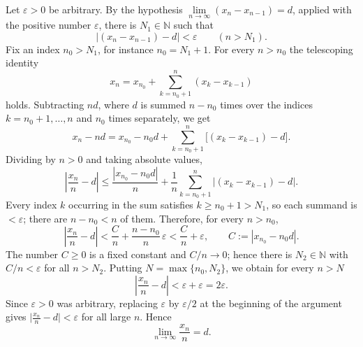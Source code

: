 \documentclass[11pt,a4paper]{article}
\newenvironment{solution}[1]{%
  \par\addvspace{1.7ex}%
  \noindent{\color{solutioncolor}\textbf{#1}}\hspace{0.55em}\ignorespaces}%
  {\par\addvspace{0.9ex}}
\begin{document}
\begin{solution}{Solution 2.1.9}\label{xs:2.1.9}
Let $\varepsilon>0$ be arbitrary. By the hypothesis $\lim\limits_{n\to\infty}(x_n-x_{n-1})=d$, applied with the positive number $\varepsilon$, there is $N_1\in\mathbb{N}$ such that
\[
\bigl|(x_n-x_{n-1})-d\bigr|<\varepsilon\qquad(n>N_1).
\]
Fix an index $n_0>N_1$, for instance $n_0=N_1+1$. For every $n>n_0$ the telescoping identity
\[
x_n=x_{n_0}+\sum_{k=n_0+1}^{n}(x_k-x_{k-1})
\]
holds. Subtracting $nd$, where $d$ is summed $n-n_0$ times over the indices $k=n_0+1,\dots,n$ and $n_0$ times separately, we get
\[
x_n-nd=x_{n_0}-n_0d+\sum_{k=n_0+1}^{n}\bigl[(x_k-x_{k-1})-d\bigr].
\]
Dividing by $n>0$ and taking absolute values,
\[
\left|\frac{x_n}{n}-d\right|
\le\frac{|x_{n_0}-n_0d|}{n}+\frac{1}{n}\sum_{k=n_0+1}^{n}\bigl|(x_k-x_{k-1})-d\bigr| .
\]
Every index $k$ occurring in the sum satisfies $k\ge n_0+1>N_1$, so each summand is $<\varepsilon$; there are $n-n_0<n$ of them. Therefore, for every $n>n_0$,
\[
\left|\frac{x_n}{n}-d\right|
<\frac{C}{n}+\frac{n-n_0}{n}\,\varepsilon
<\frac Cn+\varepsilon,
\qquad C:=|x_{n_0}-n_0d| .
\]
The number $C\ge 0$ is a fixed constant and $C/n\to 0$; hence there is $N_2\in\mathbb{N}$ with $C/n<\varepsilon$ for all $n>N_2$. Putting $N=\max\{n_0,N_2\}$, we obtain for every $n>N$
\[
\left|\frac{x_n}{n}-d\right|<\varepsilon+\varepsilon=2\varepsilon .
\]
Since $\varepsilon>0$ was arbitrary, replacing $\varepsilon$ by $\varepsilon/2$ at the beginning of the argument gives $\bigl|\frac{x_n}{n}-d\bigr|<\varepsilon$ for all large $n$. Hence
\[
\lim_{n\to\infty}\frac{x_n}{n}=d .
\]
\end{solution}
\end{document}
